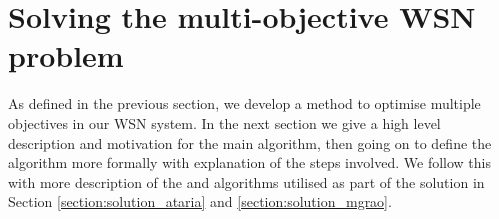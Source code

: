 \section{Solving the multi-objective WSN problem}
\label{section:solution}
As defined in the previous section, we develop a method to optimise multiple objectives in our WSN system. In the next section we give a high level description and motivation for the main \acronymWSNOptimisation{}{} algorithm, then going on to define the algorithm more formally with explanation of the steps involved. We follow this with more description of the \acronymATARIA{}{} and \acronymMGRAO{}{} algorithms utilised as part of the solution in Section \ref{section:solution_ataria} and \ref{section:solution_mgrao}.
